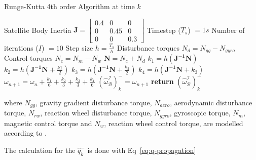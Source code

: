 \begin{algorithm}[!htb]
	\caption[Runge-Kutta]{Runge-Kutta 4th order Algorithm at time $k$}
	\label{alg: Runge-Kutta}
	\begin{algorithmic}[1]
		\State Satellite Body Inertia $\mathbf{J} = \begin{bmatrix}
			0.4 & 0 & 0\\
			0 & 0.45 & 0 \\
			0 & 0 & 0.3
		\end{bmatrix}$
		\State Timestep ($T_s$) $= 1s$
		\State Number of iterations ($I$) $= 10$
		\State Step size $h = \frac{T_s}{h}$
		\State Disturbance torques $N_d = N_{gg} - N_{gyro} $ %
		\State Control torques $N_c = N_m - N_w$
		\State $\mathbf{N} = N_c + N_d$
		\State \texttt{$k_1 = h(\mathbf{J^{-1}}\mathbf{N})$}
		\State \texttt{$k_2 = h(\mathbf{J^{-1}}\mathbf{N} + \frac{k1}{2})$}
		\State \texttt{$k_3 = h(\mathbf{J^{-1}}\mathbf{N} + \frac{k_2}{2})$}
		\State \texttt{$k_4 = h(\mathbf{J^{-1}}\mathbf{N} + k_3)$}
		\State \texttt{$\omega_{n+1}=\omega_n + \frac{k_1}{6} + \frac{k_2}{3} + \frac{k_3}{3} + \frac{k_4}{6}$}
		\EndFor
		\State $(\hat{\omega}_{\mathcal{B}}^{\mathcal{I}})_k^- = \omega_{n+1}$
		\State \textbf{return} $(\hat{\omega}_{\mathcal{B}}^{\mathcal{I}})_k^-$
	\end{algorithmic}
\end{algorithm}
where $N_{gg}$, gravity gradient disturbance torque, $N_{aero}$, aerodynamic disturbance torque, $N_{rw}$, reaction wheel disturbance torque, $N_{gyro}$, gyroscopic torque, $N_m$, magnetic control torque and $N_w$, reaction wheel control torque, are modelled according to \cite{JansevanVuuren2015}. 

The calculation for the $\hat{q}_k^-$ is done with Eq~\ref{eq:q-propagation} \cite{JansevanVuuren2015}

